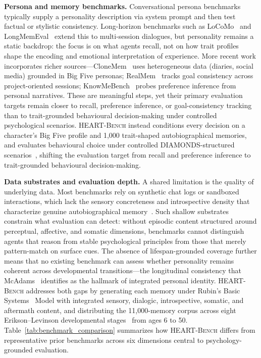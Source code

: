 \documentclass{article}
\newcommand{\todoc}[2]{{\textcolor{#1}{\textbf{[#2]}}}}
\newcommand{\todored}[1]{\todoc{red}{\textbf{#1}}}
\newcommand{\gu}[1]{\todored{gu: #1}}
\newcommand{\ourbench}[0]{\textsc{HEART-Bench}\xspace}
\begin{document}
\textbf{Persona and memory benchmarks.}
Conversational persona benchmarks typically supply a personality description via system prompt and then test factual or stylistic consistency. Long-horizon benchmarks such as LoCoMo~\cite{maharana2024evaluating} and LongMemEval~\cite{wu2024longmemeval} extend this to multi-session dialogues, but personality remains a static backdrop: the focus is on what agents recall, not on how trait profiles shape the encoding and emotional interpretation of experience. More recent work incorporates richer sources—CloneMem~\cite{hu2026clonemem} uses heterogeneous data (diaries, social media) grounded in Big Five personas; RealMem~\cite{bian2026realmem} tracks goal consistency across project-oriented sessions; KnowMeBench~\cite{wu2026knowme} probes preference inference from personal narratives. These are meaningful steps, yet their primary evaluation targets remain closer to recall, preference inference, or goal-consistency tracking than to trait-grounded behavioural decision-making under controlled psychological scenarios. \ourbench instead conditions every decision on a character's Big Five profile and 1,000 trait-shaped autobiographical memories, and evaluates behavioural choice under controlled DIAMONDS-structured scenarios~\cite{rauthmann2014diamonds}, shifting the evaluation target from recall and preference inference to trait-grounded behavioural decision-making.

\textbf{Data substrates and evaluation depth.}
A shared limitation is the quality of underlying data. Most benchmarks rely on synthetic chat logs or sandboxed interactions, which lack the sensory concreteness and introspective density that characterize genuine autobiographical memory~\cite{rubin2006basic}. Such shallow substrates constrain what evaluation can detect: without episodic content structured around perceptual, affective, and somatic dimensions, benchmarks cannot distinguish agents that reason from stable psychological principles from those that merely pattern-match on surface cues. The absence of lifespan-grounded coverage further means that no existing benchmark can assess whether personality remains coherent across developmental transitions—the longitudinal consistency that McAdams~\cite{mcadams2001psychology} identifies as the hallmark of integrated personal identity. \ourbench addresses both gaps by generating each memory under Rubin's Basic Systems~\cite{rubin2006basic} Model with integrated sensory, dialogic, introspective, somatic, and aftermath content, and distributing the 11,000-memory corpus across eight Erikson–Levinson developmental stages~\cite{erikson1963childhood,levinson1978seasons} from ages 6 to 50.
Table~\ref{tab:benchmark_comparison} summarizes how \ourbench differs from representative prior benchmarks across six dimensions central to psychology-grounded evaluation.
\end{document}
